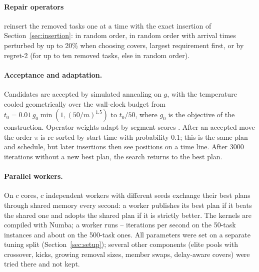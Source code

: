\paragraph{Repair operators} reinsert the removed tasks one at a time with the exact insertion of
Section~\ref{sec:insertion}: in random order, in random order with arrival times perturbed by up to 20\% when
choosing covers, largest requirement first, or by regret-2 (for up to ten removed tasks, else in random order).

\paragraph{Acceptance and adaptation.} Candidates are accepted by simulated annealing on $g$, with the temperature
cooled geometrically over the wall-clock budget from $t_0 = 0.01\, g_0 \min(1, (50/m)^{1.5})$ to $t_0 / 50$, where
$g_0$ is the objective of the construction. Operator weights adapt by segment scores \cite{ropke2006adaptive}. After
an accepted move the order $\pi$ is re-sorted by start time with probability 0.1; this is the same plan and schedule,
but later insertions then see positions on a time line. After 3000 iterations without a new best plan, the search
returns to the best plan.

\paragraph{Parallel workers.} On $c$ cores, $c$ independent workers with different seeds exchange their best plans
through shared memory every second: a worker publishes its best plan if it beats the shared one and adopts the shared
plan if it is strictly better. The kernels are compiled with Numba; a worker runs \ItsFiftylo--\ItsFiftyhi{} iterations per
second on the 50-task instances and about \ItsFivehundred{} on the 500-task ones. All parameters were set on a separate tuning split
(Section~\ref{sec:setup}); several other components (elite pools with crossover, kicks, growing removal sizes, member
swaps, delay-aware covers) were tried there and not kept.
